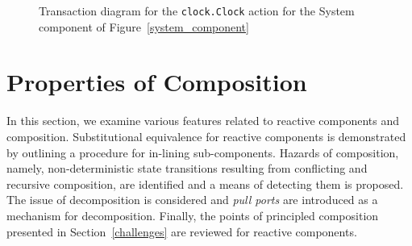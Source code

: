 \begin{figure}
\centering
\begingroup
\fontsize{10pt}{12pt}\selectfont
{}
\endgroup
\cprotect\caption{Transaction diagram for the \verb+clock.Clock+ action for the System component of Figure~\ref{system_component}}
\label{clock_transaction}
\end{figure}

\section{Properties of Composition}
\label{propcomp}
In this section, we examine various features related to reactive components and composition.
Substitutional equivalence for reactive components is demonstrated by outlining a procedure for in-lining sub-components.
Hazards of composition, namely, non-deterministic state transitions resulting from conflicting and recursive composition, are identified and a means of detecting them is proposed.
The issue of decomposition is considered and \emph{pull ports} are introduced as a mechanism for decomposition.
Finally, the points of principled composition presented in Section~\ref{challenges} are reviewed for reactive components.


